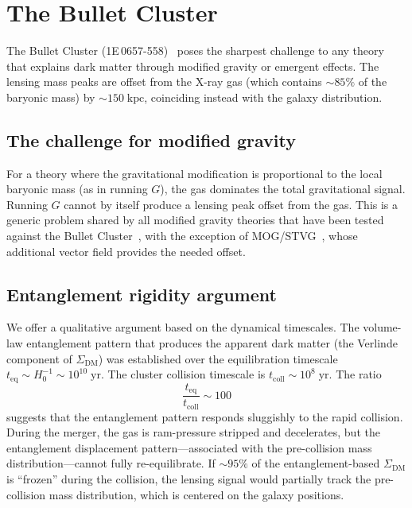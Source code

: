 \documentclass[prd,twocolumn,superscriptaddress,longbibliography,floatfix]{revtex4-2}
\begin{document}
\section{The Bullet Cluster}
\label{sec:bullet}

The Bullet Cluster (1E\,0657-558)~\cite{Clowe2006} poses the
sharpest challenge to any theory that explains dark matter
through modified gravity or emergent effects.  The lensing
mass peaks are offset from the X-ray gas (which contains
$\sim\!85\%$ of the baryonic mass) by $\sim\!150\;\mathrm{kpc}$,
coinciding instead with the galaxy distribution.

\subsection{The challenge for modified gravity}

For a theory where the gravitational modification is
proportional to the local baryonic mass (as in running $G$),
the gas dominates the total gravitational signal.  Running $G$
cannot by itself produce a lensing peak offset from the gas.
This is a generic problem shared by all modified gravity
theories that have been tested against the Bullet
Cluster~\cite{Famaey2012}, with the exception of
MOG/STVG~\cite{Brownstein2007}, whose additional vector field
provides the needed offset.

\subsection{Entanglement rigidity argument}

We offer a qualitative argument based on the dynamical
timescales.  The volume-law entanglement pattern that
produces the apparent dark matter (the Verlinde component of
$\Sigma_{\mathrm{DM}}$) was established over the equilibration
timescale
$t_{\mathrm{eq}} \sim H_0^{-1} \sim 10^{10}\;\mathrm{yr}$.
The cluster collision timescale is
$t_{\mathrm{coll}} \sim 10^{8}\;\mathrm{yr}$.  The ratio
\begin{equation}
\frac{t_{\mathrm{eq}}}{t_{\mathrm{coll}}} \sim 100
\label{eq:timescale}
\end{equation}
suggests that the entanglement pattern responds sluggishly
to the rapid collision.  During the merger, the gas is
ram-pressure stripped and decelerates, but the entanglement
displacement pattern---associated with the pre-collision mass
distribution---cannot fully re-equilibrate.  If $\sim\!95\%$ of
the entanglement-based $\Sigma_{\mathrm{DM}}$ is ``frozen''
during the collision, the lensing signal would partially track
the pre-collision mass distribution, which is centered on the
galaxy positions.
\end{document}
